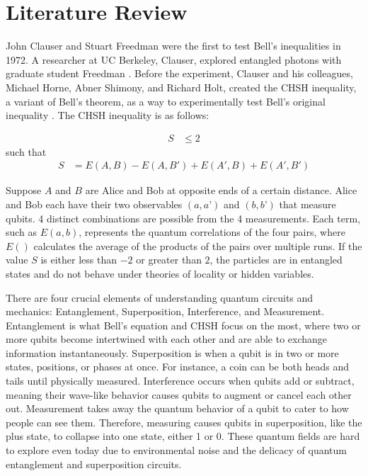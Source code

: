 \documentclass[a4paper, onecolumn, 11pt, titlepage]{quantumarticle}
\begin{document}
\section{Literature Review}

John Clauser and Stuart Freedman were the first to test Bell’s inequalities in 1972. A researcher at UC Berkeley, Clauser, explored entangled photons with graduate student Freedman \cite{PhysRevLett.28.938}. Before the experiment, Clauser and his colleagues, Michael Horne, Abner Shimony, and Richard Holt, created the CHSH inequality, a variant of Bell’s theorem, as a way to experimentally test Bell’s original inequality \cite{PhysRevLett.23.880}. The CHSH inequality is as follows:

\begin{equation} \label{eq1}
\begin{split}
    S & \leq 2
\end{split}
\end{equation}
such that 
\begin{equation} \label{eq2}
\begin{split}
    S & = E(A,B) - E(A, B') +E(A', B) + E(A', B')
\end{split}
\end{equation}

Suppose $A$ and $B$ are Alice and Bob at opposite ends of a certain distance. Alice and Bob each have their two observables $(a, a’)$ and $(b, b’)$ that measure qubits. 4 distinct combinations are possible from the 4 measurements. Each term, such as $E(a,b)$, represents the quantum correlations of the four pairs, where $E()$ calculates the average of the products of the pairs over multiple runs. If the value $S$ is either less than $-2$ or greater than $2$, the particles are in entangled states and do not behave under theories of locality or hidden variables. 

There are four crucial elements of understanding quantum circuits and mechanics: Entanglement, Superposition, Interference, and Measurement. Entanglement is what Bell's equation and CHSH focus on the most, where two or more qubits become intertwined with each other and are able to exchange information instantaneously. Superposition is when a qubit is in two or more states, positions, or phases at once. For instance, a coin can be both heads and tails until physically measured. Interference occurs when qubits add or subtract, meaning their wave-like behavior causes qubits to augment or cancel each other out. Measurement takes away the quantum behavior of a qubit to cater to how people can see them. Therefore, measuring causes qubits in superposition, like the plus state, to collapse into one state, either 1 or 0. These quantum fields are hard to explore even today due to environmental noise and the delicacy of quantum entanglement and superposition circuits. 
\end{document}
